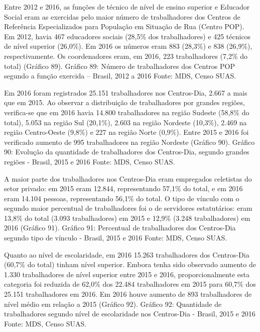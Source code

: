 \documentclass[
  brazilian]{report}
\begin{document}
Entre 2012 e 2016, as funções de técnico de nível de ensino superior e
Educador Social eram as exercidas pelo maior número de trabalhadores dos
Centros de Referência Especializados para População em Situação de Rua
(Centro POP). Em 2012, havia 467 educadores sociais (28,5\% dos
trabalhadores) e 425 técnicos de nível superior (26,0\%). Em 2016 os
números eram 883 (28,3\%) e 838 (26,9\%), respectivamente. Os
coordenadores eram, em 2016, 223 trabalhadores (7,2\% do total) (Gráfico
89). Gráfico 89: Número de trabalhadores dos Centros POP segundo a
função exercida -- Brasil, 2012 a 2016 Fonte: MDS, Censo SUAS.

Em 2016 foram registrados 25.151 trabalhadores nos Centros-Dia, 2.667 a
mais que em 2015. Ao observar a distribuição de trabalhadores por
grandes regiões, verifica-se que em 2016 havia 14.800 trabalhadores na
região Sudeste (58,8\% do total), 5.053 na região Sul (20,1\%), 2.603 na
região Nordeste (10,3\%), 2.469 na região Centro-Oeste (9,8\%) e 227 na
região Norte (0,9\%). Entre 2015 e 2016 foi verificado aumento de 995
trabalhadores na região Nordeste (Gráfico 90). Gráfico 90: Evolução da
quantidade de trabalhadores dos Centros-Dia, segundo grandes regiões -
Brasil, 2015 e 2016 Fonte: MDS, Censo SUAS.

A maior parte dos trabalhadores nos Centros-Dia eram empregados
celetistas do setor privado: em 2015 eram 12.844, representando 57,1\%
do total, e em 2016 eram 14.104 pessoas, representando 56,1\% do total.
O tipo de vínculo com o segundo maior percentual de trabalhadores foi o
de servidores estatutários: eram 13,8\% do total (3.093 trabalhadores)
em 2015 e 12,9\% (3.248 trabalhadores) em 2016 (Gráfico 91). Gráfico 91:
Percentual de trabalhadores dos Centros-Dia segundo tipo de vínculo -
Brasil, 2015 e 2016 Fonte: MDS, Censo SUAS.

Quanto ao nível de escolaridade, em 2016 15.263 trabalhadores dos
Centros-Dia (60,7\% do total) tinham nível superior. Embora tenha sido
observado aumento de 1.330 trabalhadores de nível superior entre 2015 e
2016, proporcionalmente esta categoria foi reduzida de 62,0\% dos 22.484
trabalhadores em 2015 para 60,7\% dos 25.151 trabalhadores em 2016. Em
2016 houve aumento de 893 trabalhadores de nível médio em relação a 2015
(Gráfico 92). Gráfico 92: Quantidade de trabalhadores segundo nível de
escolaridade nos Centros-Dia - Brasil, 2015 e 2016 Fonte: MDS, Censo
SUAS.
\end{document}
